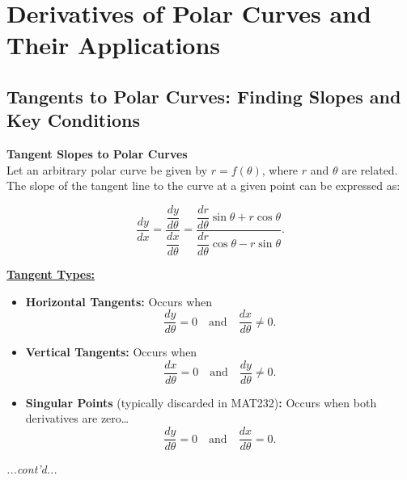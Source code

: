 \documentclass{article}
\begin{document}
\section*{Derivatives of Polar Curves and Their Applications}

\subsection*{Tangents to Polar Curves: Finding Slopes and Key Conditions}

\begin{theorembox}
\textbf{Tangent Slopes to Polar Curves} \\
Let an arbitrary polar curve be given by \( r = f(\theta) \), where \( r \) and \( \theta \) are related. The slope of the tangent line to the curve at a given point can be expressed as:

\[
    \dfrac{dy}{dx} = \dfrac{\dfrac{dy}{d\theta}}{\dfrac{dx}{d\theta}} = \dfrac{\dfrac{dr}{d\theta} \sin\theta + r \cos\theta}{\dfrac{dr}{d\theta} \cos\theta - r \sin\theta}.
\]

\textbf{\underline{Tangent Types:}}
\begin{itemize}
    \item \textbf{Horizontal Tangents:} Occurs when
    \[
        \frac{dy}{d\theta} = 0 \quad \text{and} \quad \frac{dx}{d\theta} \neq 0.
    \]
    \item \textbf{Vertical Tangents:} Occurs when
    \[
        \frac{dx}{d\theta} = 0 \quad \text{and} \quad \frac{dy}{d\theta} \neq 0.
    \]
    \item \textbf{Singular Points} (typically discarded in MAT232)\textbf{:} Occurs when both derivatives are zero\dots
    \[
        \frac{dy}{d\theta} = 0 \quad \text{and} \quad \frac{dx}{d\theta} = 0.
    \]
\end{itemize}
\textit{...cont'd...}
\end{theorembox}
\end{document}
